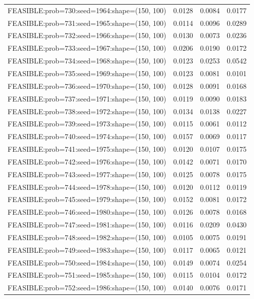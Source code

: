\begin{longtable}{lccc}
FEASIBLE:prob=730:seed=1964:shape=(150, 100) &   0.0128 & 0.0084 & 0.0177 \\
FEASIBLE:prob=731:seed=1965:shape=(150, 100) &   0.0114 & 0.0096 & 0.0289 \\
FEASIBLE:prob=732:seed=1966:shape=(150, 100) &   0.0130 & 0.0073 & 0.0236 \\
FEASIBLE:prob=733:seed=1967:shape=(150, 100) &   0.0206 & 0.0190 & 0.0172 \\
FEASIBLE:prob=734:seed=1968:shape=(150, 100) &   0.0123 & 0.0253 & 0.0542 \\
FEASIBLE:prob=735:seed=1969:shape=(150, 100) &   0.0123 & 0.0081 & 0.0101 \\
FEASIBLE:prob=736:seed=1970:shape=(150, 100) &   0.0128 & 0.0091 & 0.0168 \\
FEASIBLE:prob=737:seed=1971:shape=(150, 100) &   0.0119 & 0.0090 & 0.0183 \\
FEASIBLE:prob=738:seed=1972:shape=(150, 100) &   0.0134 & 0.0138 & 0.0227 \\
FEASIBLE:prob=739:seed=1973:shape=(150, 100) &   0.0115 & 0.0061 & 0.0112 \\
FEASIBLE:prob=740:seed=1974:shape=(150, 100) &   0.0157 & 0.0069 & 0.0117 \\
FEASIBLE:prob=741:seed=1975:shape=(150, 100) &   0.0120 & 0.0107 & 0.0175 \\
FEASIBLE:prob=742:seed=1976:shape=(150, 100) &   0.0142 & 0.0071 & 0.0170 \\
FEASIBLE:prob=743:seed=1977:shape=(150, 100) &   0.0125 & 0.0078 & 0.0175 \\
FEASIBLE:prob=744:seed=1978:shape=(150, 100) &   0.0120 & 0.0112 & 0.0119 \\
FEASIBLE:prob=745:seed=1979:shape=(150, 100) &   0.0152 & 0.0081 & 0.0172 \\
FEASIBLE:prob=746:seed=1980:shape=(150, 100) &   0.0126 & 0.0078 & 0.0168 \\
FEASIBLE:prob=747:seed=1981:shape=(150, 100) &   0.0116 & 0.0209 & 0.0430 \\
FEASIBLE:prob=748:seed=1982:shape=(150, 100) &   0.0105 & 0.0075 & 0.0191 \\
FEASIBLE:prob=749:seed=1983:shape=(150, 100) &   0.0117 & 0.0065 & 0.0121 \\
FEASIBLE:prob=750:seed=1984:shape=(150, 100) &   0.0149 & 0.0074 & 0.0254 \\
FEASIBLE:prob=751:seed=1985:shape=(150, 100) &   0.0115 & 0.0104 & 0.0172 \\
FEASIBLE:prob=752:seed=1986:shape=(150, 100) &   0.0140 & 0.0076 & 0.0171 \\

\end{longtable}
